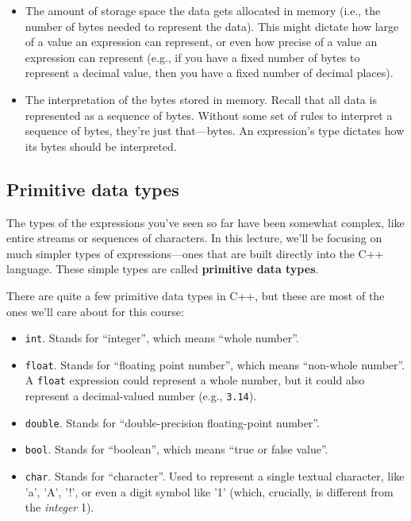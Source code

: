 \documentclass{article}
\begin{document}
\begin{itemize}
    \item The amount of storage space the data gets allocated in memory (i.e., the number of bytes needed to represent the data). This might dictate how large of a value an expression can represent, or even how precise of a value an expression can represent (e.g., if you have a fixed number of bytes to represent a decimal value, then you have a fixed number of decimal places).
    \item The interpretation of the bytes stored in memory. Recall that all data is represented as a sequence of bytes. Without some set of rules to interpret a sequence of bytes, they're just that---bytes. An expression's type dictates how its bytes should be interpreted.
\end{itemize}

\subsection{Primitive data types}

The types of the expressions you've seen so far have been somewhat complex, like entire streams or sequences of characters. In this lecture, we'll be focusing on much simpler types of expressions---ones that are built directly into the C++ language. These simple types are called \textbf{primitive data types}.

There are quite a few primitive data types in C++, but these are most of the ones we'll care about for this course:

\begin{itemize}
    \item \texttt{int}. Stands for ``integer'', which means ``whole number''.
    \item \texttt{float}. Stands for ``floating point number'', which means ``non-whole number''. A \texttt{float} expression could represent a whole number, but it could also represent a decimal-valued number (e.g., \texttt{3.14}).
    \item \texttt{double}. Stands for ``double-precision floating-point number''.
    \item \texttt{bool}. Stands for ``boolean'', which means ``true or false value''.
    \item \texttt{char}. Stands for ``character''. Used to represent a single textual character, like 'a', 'A', '!', or even a digit symbol like '1' (which, crucially, is different from the \textit{integer} 1).
\end{itemize}
\end{document}

